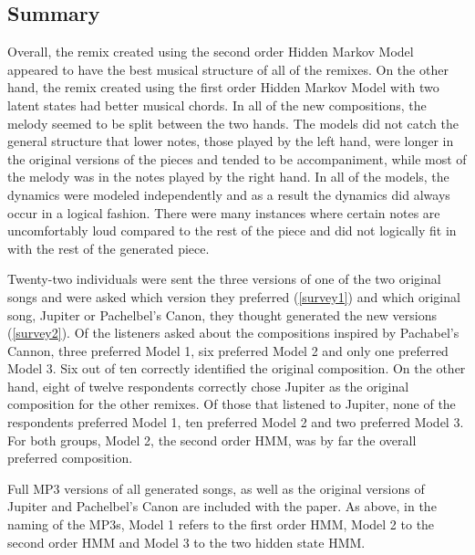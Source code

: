 \documentclass{article} %
\begin{document}
\subsection{Summary}
Overall, the remix created using the second order Hidden Markov Model appeared to have the best musical structure of all of the remixes. On the other hand, the remix created using the first order Hidden Markov Model with two latent states had better musical chords. In all of the new compositions, the melody seemed to be split between the two hands. The models did not catch the general structure that lower notes, those played by the left hand, were longer in the original versions of the pieces and tended to be accompaniment, while most of the melody was in the notes played by the right hand. In all of the models, the dynamics were modeled independently and as a result the dynamics did always occur in a logical fashion. There were many instances where certain notes are uncomfortably loud compared to the rest of the piece and did not logically fit in with the rest of the generated piece. 

Twenty-two individuals were sent the three versions of one of the two original songs and were asked which version they preferred (\autoref{survey1}) and which original song, Jupiter or Pachelbel's Canon, they thought generated the new versions (\autoref{survey2}). Of the listeners asked about the compositions inspired by Pachabel's Cannon, three preferred Model 1, six preferred Model 2 and only one preferred Model 3. Six out of ten correctly identified the original composition. On the other hand, eight of twelve respondents correctly chose Jupiter as the original composition for the other remixes. Of those that listened to Jupiter, none of the respondents preferred Model 1, ten preferred Model 2 and two preferred Model 3. For both groups, Model 2, the second order HMM,  was by far the overall preferred composition.  

Full MP3 versions of all generated songs, as well as the original versions of Jupiter and Pachelbel's Canon are included with the paper.  As above, in the naming of the MP3s, Model 1 refers to the first order HMM, Model 2 to the second order HMM and Model 3 to the two hidden state HMM.
\end{document}
